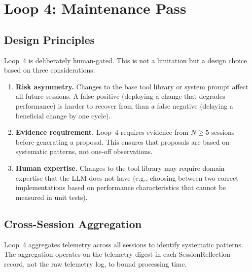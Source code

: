 \section{Loop 4: Maintenance Pass}

\label{sec:loop4}

\subsection{Design Principles}

Loop~4 is deliberately human-gated. This is not a limitation but a design
choice based on three considerations:

\begin{enumerate}[leftmargin=1.5em]
    \item \textbf{Risk asymmetry.} Changes to the base tool library or system
          prompt affect all future sessions. A false positive (deploying a
          change that degrades performance) is harder to recover from than
          a false negative (delaying a beneficial change by one cycle).

    \item \textbf{Evidence requirement.} Loop~4 requires evidence from $N \geq 5$
          sessions before generating a proposal. This ensures that proposals
          are based on systematic patterns, not one-off observations.

    \item \textbf{Human expertise.} Changes to the tool library may require
          domain expertise that the LLM does not have (e.g., choosing between
          two correct implementations based on performance characteristics
          that cannot be measured in unit tests).
\end{enumerate}

\subsection{Cross-Session Aggregation}

Loop~4 aggregates telemetry across all sessions to identify systematic patterns.
The aggregation operates on the telemetry digest in each SessionReflection record,
not the raw telemetry log, to bound processing time.


